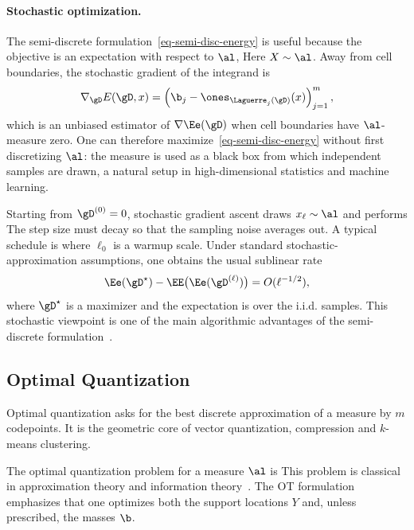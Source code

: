 \paragraph{Stochastic optimization.}

The semi-discrete formulation~\eqref{eq-semi-disc-energy} is useful because the objective is an expectation with respect to $\al$,
Here $X\sim\al$. Away from cell boundaries, the stochastic gradient of the integrand is
\[
	\nabla_{\gD}E(\gD,x)
	=
	\left(\b_j-\ones_{\Laguerre_j(\gD)}(x)\right)_{j=1}^m,
\]
which is an unbiased estimator of $\nabla\Ee(\gD)$ when cell boundaries have $\al$-measure zero. One can therefore maximize~\eqref{eq-semi-disc-energy} without first discretizing $\al$: the measure is used as a black box from which independent samples are drawn, a natural setup in high-dimensional statistics and machine learning.

Starting from $\gD^{(0)}=0$, stochastic gradient ascent draws $x_\ell\sim\al$ and performs
The step size must decay so that the sampling noise averages out. A typical schedule is
where $\ell_0$ is a warmup scale. Under standard stochastic-approximation assumptions, one obtains the usual sublinear rate
\[
	\Ee(\gD^\star)-\EE\big(\Ee(\gD^{(\ell)})\big)
	=
	O(\ell^{-1/2}),
\]
where $\gD^\star$ is a maximizer and the expectation is over the i.i.d. samples. This stochastic viewpoint is one of the main algorithmic advantages of the semi-discrete formulation~\cite{Merigot11,genevay2016stochastic}.


\subsection{Optimal Quantization}
\label{sec-optimal-quantization}

Optimal quantization asks for the best discrete approximation of a measure by $m$ codepoints. It is the geometric core of vector quantization, compression and $k$-means clustering.

The optimal quantization problem for a measure $\al$ is
This problem is classical in approximation theory and information theory~\cite{graf2000foundationsquantization,Lloyd82}. The OT formulation emphasizes that one optimizes both the support locations $Y$ and, unless prescribed, the masses $\b$.

